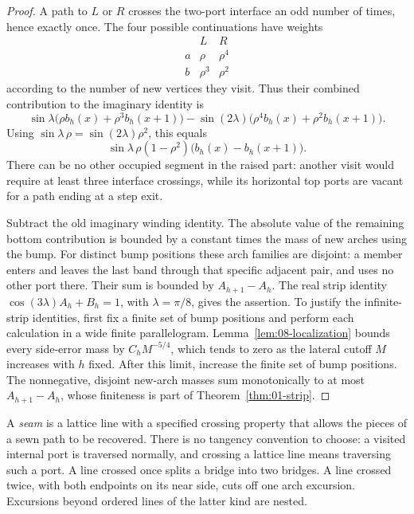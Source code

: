 \begin{proof}
A path to $L$ or $R$ crosses the two-port interface an odd number of
times, hence exactly once. The four possible continuations have weights
\[
\begin{array}{c|cc}
 & L & R\\ \hline
 a & \rho & \rho^4\\
 b & \rho^3 & \rho^2
\end{array}
\]
according to the number of new vertices they visit. Thus their combined
contribution to the imaginary identity is
\[
 \sin\lambda\bigl(\rho b_h(x)+\rho^3b_h(x+1)\bigr)
 -\sin(2\lambda)\bigl(\rho^4b_h(x)+\rho^2b_h(x+1)\bigr).
\]
Using $\sin\lambda\,\rho=\sin(2\lambda)\rho^2$, this equals
\[
 \sin\lambda\,\rho(1-\rho^2)
       \bigl(b_h(x)-b_h(x+1)\bigr).
\]
There can be no other occupied segment in the raised part: another visit
would require at least three interface crossings, while its horizontal
top ports are vacant for a path ending at a step exit.

Subtract the old imaginary winding identity. The absolute value of the
remaining bottom contribution is bounded by a constant times the mass of
new arches using the bump. For distinct bump positions these arch families
are disjoint: a member enters and leaves the last band through that specific
adjacent pair, and uses no other port there. Their sum is bounded by
\(A_{h+1}-A_h\). The real strip identity
\(\cos(3\lambda)A_h+B_h=1\), with \(\lambda=\pi/8\), gives
the assertion. To justify the infinite-strip identities, first fix a finite set of
bump positions and perform each calculation in a wide finite
parallelogram. Lemma~\ref{lem:08-localization} bounds every side-error
mass by \(C_h M^{-5/4}\), which tends to zero as the lateral cutoff
\(M\) increases with \(h\) fixed. After this limit, increase the finite
set of bump positions. The nonnegative, disjoint new-arch masses sum
monotonically to at most \(A_{h+1}-A_h\), whose
finiteness is part of Theorem~\ref{thm:01-strip}.
\end{proof}

A \emph{seam} is a lattice line with a specified crossing property that
allows the pieces of a sewn path to be recovered. There is no tangency
convention to choose: a visited internal port is traversed normally, and
crossing a lattice line means traversing such a port. A line crossed once
splits a bridge into two bridges. A line crossed twice, with both endpoints
on its near side, cuts off one arch excursion. Excursions beyond ordered
lines of the latter kind are nested.

